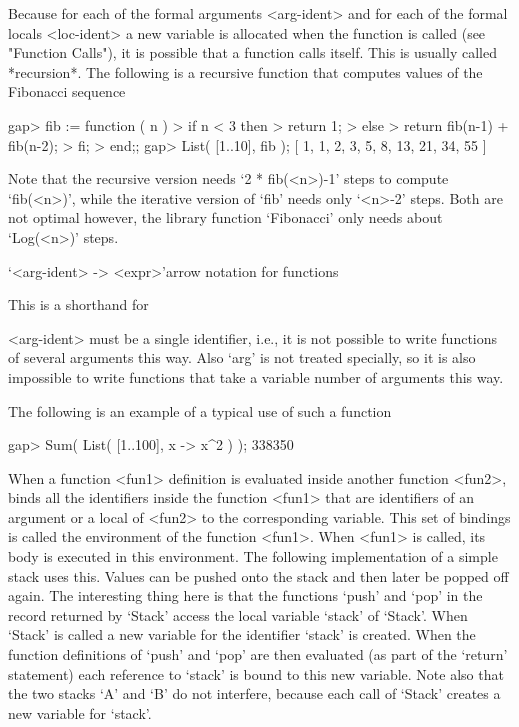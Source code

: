 Because for each of the formal arguments <arg-ident> and for each of the
formal locals <loc-ident> a new variable is allocated when the function
is called (see "Function Calls"), it is possible that a function calls
itself. This is usually called *recursion*. The following is a recursive
function that computes values of the Fibonacci sequence

\beginexample
gap> fib := function ( n )
>     if n < 3 then
>       return 1;
>     else
>       return fib(n-1) + fib(n-2);
>     fi;
>   end;;
gap> List( [1..10], fib );
[ 1, 1, 2, 3, 5, 8, 13, 21, 34, 55 ]
\endexample

Note that the recursive version needs `2 * fib(<n>)-1' steps to compute
`fib(<n>)', while the iterative version  of `fib' needs only `<n>-2'
steps.  Both are not optimal however, the library function `Fibonacci'
only needs about `Log(<n>)' steps.

\>`<arg-ident> -> <expr>'{arrow notation for functions}

This is a shorthand for


<arg-ident> must be a single identifier, i.e., it is not possible to
write functions of several arguments this way. Also `arg' is not treated
specially, so it is also impossible to write functions that take a
variable number of arguments this way.

The following is an example of a typical use of such a function

\beginexample
gap> Sum( List( [1..100], x -> x^2 ) );
338350
\endexample

When a function <fun1> definition is evaluated inside another function
<fun2>, {\GAP} binds all the identifiers inside the function <fun1> that
are identifiers of an argument or a local of <fun2> to the corresponding
variable. This set of bindings is called the environment of the function
<fun1>. When <fun1> is called, its body is executed in this environment.
The following implementation of a simple stack uses this. Values can be
pushed onto the stack and then later be popped off again.  The
interesting thing here is that the functions `push' and `pop' in the
record returned by `Stack' access the local variable `stack' of `Stack'.
When `Stack' is called a new variable for the identifier `stack' is
created.  When the function definitions of `push' and `pop' are then
evaluated (as part of the `return' statement) each reference to `stack'
is bound to this new variable. Note also that the two stacks `A' and `B'
do not interfere, because each call of `Stack' creates a new variable for
`stack'.

